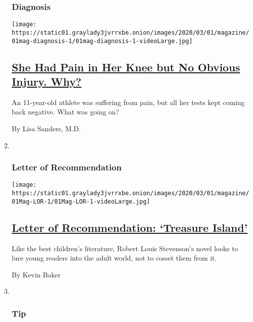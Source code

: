 \begin{enumerate}
{  \subsubsection{Diagnosis}\label{diagnosis}}

  \texttt{[image: https://static01.graylady3jvrrxbe.onion/images/2020/03/01/magazine/01mag-diagnosis-1/01mag-diagnosis-1-videoLarge.jpg]}

  \hypertarget{she-had-pain-in-her-knee-but-no-obvious-injury-why}{%
  \subsection{\texorpdfstring{\href{/2020/02/26/magazine/crmo-chronic-recurrent-multifocal-osteomyelitis-diagnosis.html}{She
  Had Pain in Her Knee but No Obvious Injury.
  Why?}}{She Had Pain in Her Knee but No Obvious Injury. Why?}}\label{she-had-pain-in-her-knee-but-no-obvious-injury-why}}

  An 11-year-old athlete was suffering from pain, but all her tests kept
  coming back negative. What was going on?

  By Lisa Sanders, M.D.
\item ~
  \hypertarget{letter-of-recommendation}{%
  \subsubsection{Letter of
  Recommendation}\label{letter-of-recommendation}}

  \texttt{[image: https://static01.graylady3jvrrxbe.onion/images/2020/03/01/magazine/01Mag-LOR-1/01Mag-LOR-1-videoLarge.jpg]}

  \hypertarget{letter-of-recommendation-treasure-island}{%
  \subsection{\texorpdfstring{\href{/2020/02/25/magazine/treasure-island-robert-louis-stevenson-book.html}{Letter
  of Recommendation: `Treasure
  Island'}}{Letter of Recommendation: `Treasure Island'}}\label{letter-of-recommendation-treasure-island}}

  Like the best children's literature, Robert Louis Stevenson's novel
  looks to lure young readers into the adult world, not to cosset them
  from it.

  By Kevin Baker
\item ~
  \hypertarget{tip}{%
  \subsubsection{Tip}\label{tip}}


\end{enumerate}

